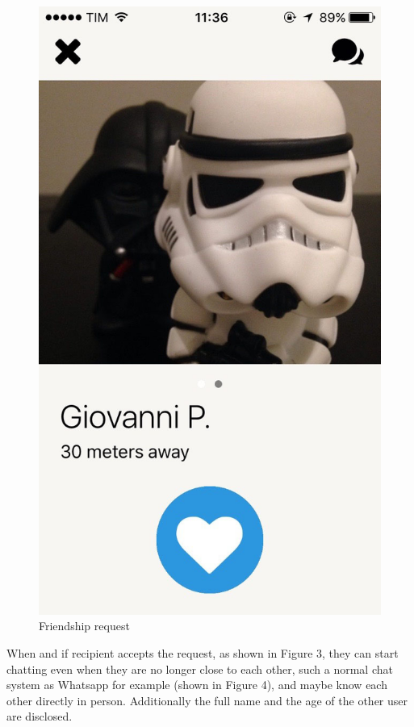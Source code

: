 \begin{multicols}{2}
\begin{figure}[H]
\centering
\includegraphics[scale=0.15]{./images/friendship_req.jpg}
\caption{\label{Friendship request}Friendship request}
\end{figure}
\end{multicols}

When and if recipient accepts the request, as shown in Figure 3, they can start chatting even when they are no longer close to each other, such a normal chat system as Whatsapp for example (shown in Figure 4), and maybe know each other directly in person. Additionally the full name and the age of the other user are disclosed.

